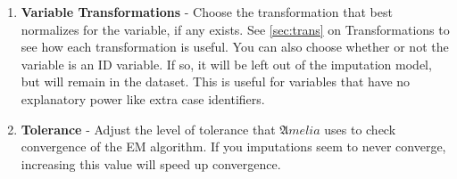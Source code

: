\documentclass[12pt,titlepage]{article}
\newcommand{\Amelia}{\ensuremath{\mathfrak Amelia} }
\begin{document}
\begin{enumerate}
\item \textbf{Variable Transformations} - Choose the transformation
  that best normalizes for the variable, if any exists.  See
  \ref{sec:trans} on Transformations to see how each transformation is
  useful.  You can also choose whether or not the variable is an ID
  variable.  If so, it will be left out of the imputation model, but
  will remain in the dataset.  This is useful for variables that have
  no explanatory power like extra case identifiers.
\item \textbf{Tolerance} - Adjust the level of tolerance that \Amelia
  uses to check convergence of the EM algorithm.  If you imputations
  seem to never converge, increasing this value will speed up convergence.
\end{enumerate}
\end{document}
